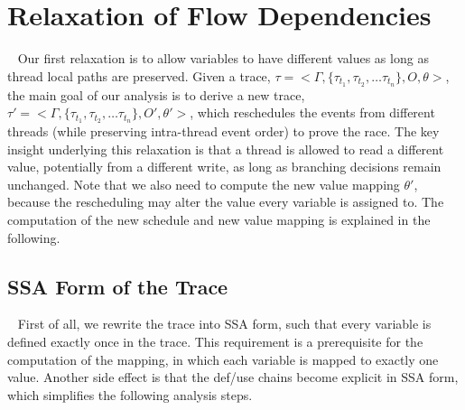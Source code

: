 \section{Relaxation of Flow Dependencies}~\label{sec:relax1}
Our first relaxation is to allow variables to have different values 
as long as thread local paths are preserved.
Given a trace, $\tau=<\Gamma , \{\tau_{t_1}, \tau_{t_2}, \dots \tau_{t_n} \}, 
O, \theta>$, the main goal of our analysis is to derive a new trace,
  $\tau'=<\Gamma , \{\tau_{t_1}, \tau_{t_2}, \dots \tau_{t_n} \}, O', \theta'>$,
 which reschedules the events from different threads (while preserving 
intra-thread event order) to prove the race. The key insight underlying 
this relaxation is that a thread is allowed to read a different value, 
potentially from a different write, as long as branching decisions 
remain unchanged. Note that we also need to compute the new value 
mapping $\theta'$, because the rescheduling may alter the value every 
variable is assigned to. The computation of the new schedule and new value 
mapping is explained in the following.







\subsection{SSA Form of the Trace}~\label{sec:ssa}
First of all, we rewrite the trace into SSA form, such that every variable is
defined exactly once in the trace. This requirement is a prerequisite for 
the computation of the mapping, in which each variable is mapped to exactly 
one value. Another side effect is that the def/use chains become explicit 
in SSA form, which simplifies the following analysis steps.

